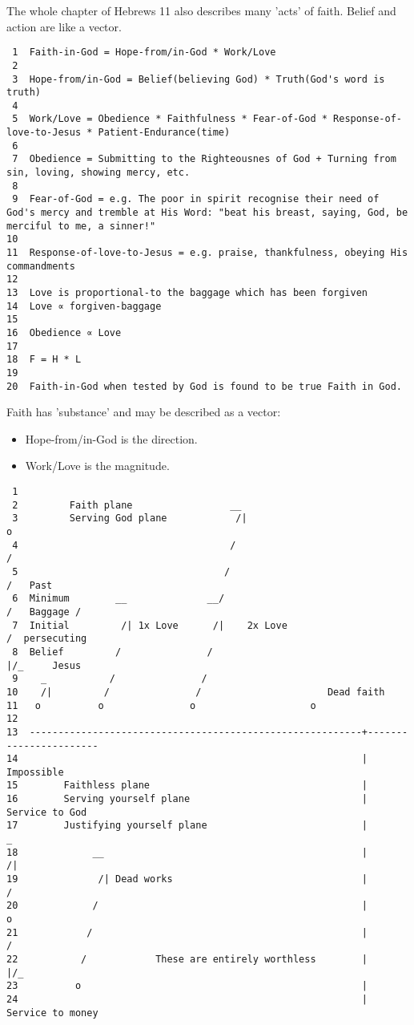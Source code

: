 \documentclass[11pt]{article}
\begin{document}
The whole chapter of Hebrews 11 also describes many 'acts' of faith. Belief and action are like a vector.

\begin{verbatim}
 1  Faith-in-God = Hope-from/in-God * Work/Love
 2  
 3  Hope-from/in-God = Belief(believing God) * Truth(God's word is truth)
 4  
 5  Work/Love = Obedience * Faithfulness * Fear-of-God * Response-of-love-to-Jesus * Patient-Endurance(time)
 6  
 7  Obedience = Submitting to the Righteousnes of God + Turning from sin, loving, showing mercy, etc.
 8  
 9  Fear-of-God = e.g. The poor in spirit recognise their need of God's mercy and tremble at His Word: "beat his breast, saying, God, be merciful to me, a sinner!"
10  
11  Response-of-love-to-Jesus = e.g. praise, thankfulness, obeying His commandments
12  
13  Love is proportional-to the baggage which has been forgiven
14  Love ∝ forgiven-baggage
15  
16  Obedience ∝ Love
17  
18  F = H * L
19  
20  Faith-in-God when tested by God is found to be true Faith in God.
\end{verbatim}

Faith has 'substance' and may be described as a vector:
\begin{itemize}
\item Hope-from/in-God is the direction.
\item Work/Love is the magnitude.
\end{itemize}

\begin{verbatim}
 1  
 2         Faith plane                 __
 3         Serving God plane            /|                                o
 4                                     /                                 /
 5                                    /                                 /   Past
 6  Minimum        __              __/                                 /   Baggage /
 7  Initial         /| 1x Love      /|    2x Love                     /  persecuting
 8  Belief         /               /                                |/_     Jesus
 9    _           /               /
10    /|         /               /                      Dead faith
11   o          o               o                    o
12  
13  ----------------------------------------------------------+-----------------------
14                                                            |       Impossible
15        Faithless plane                                     |
16        Serving yourself plane                              |        Service to God
17        Justifying yourself plane                           |            _
18             __                                             |            /|
19              /| Dead works                                 |           /
20             /                                              |          o
21            /                                               |         /
22           /            These are entirely worthless        |       |/_
23          o                                                 |
24                                                            |   Service to money
\end{verbatim}
\end{document}
